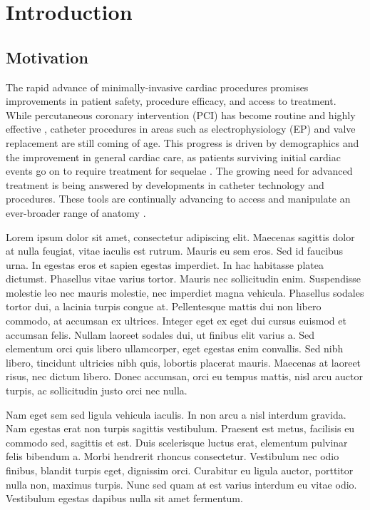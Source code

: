\chapter{\label{ch:1-intro}Introduction} 

\section{Motivation}

The rapid advance of minimally-invasive cardiac procedures promises improvements in patient safety, procedure efficacy, and access to treatment.  While percutaneous coronary intervention (PCI) has become routine and highly effective \cite{bravata_systematic_2007}, catheter procedures in areas such as electrophysiology (EP) and valve replacement are still coming of age.  This progress is driven by demographics and the improvement in general cardiac care, as patients surviving initial cardiac events go on to require treatment for sequelae \cite{foot_demographics_2000}.  The growing need for advanced treatment is being answered by developments in catheter technology and procedures.  These tools are continually advancing to access and manipulate an ever-broader range of anatomy \cite{sousa_new_2005}.

Lorem ipsum dolor sit amet, consectetur adipiscing elit. Maecenas sagittis dolor at nulla feugiat, vitae iaculis est rutrum. Mauris eu sem eros. Sed id faucibus urna. In egestas eros et sapien egestas imperdiet. In hac habitasse platea dictumst. Phasellus vitae varius tortor. Mauris nec sollicitudin enim. Suspendisse molestie leo nec mauris molestie, nec imperdiet magna vehicula. Phasellus sodales tortor dui, a lacinia turpis congue at. Pellentesque mattis dui non libero commodo, at accumsan ex ultrices. Integer eget ex eget dui cursus euismod et accumsan felis. Nullam laoreet sodales dui, ut finibus elit varius a. Sed elementum orci quis libero ullamcorper, eget egestas enim convallis. Sed nibh libero, tincidunt ultricies nibh quis, lobortis placerat mauris. Maecenas at laoreet risus, nec dictum libero. Donec accumsan, orci eu tempus mattis, nisl arcu auctor turpis, ac sollicitudin justo orci nec nulla.

Nam eget sem sed ligula vehicula iaculis. In non arcu a nisl interdum gravida. Nam egestas erat non turpis sagittis vestibulum. Praesent est metus, facilisis eu commodo sed, sagittis et est. Duis scelerisque luctus erat, elementum pulvinar felis bibendum a. Morbi hendrerit rhoncus consectetur. Vestibulum nec odio finibus, blandit turpis eget, dignissim orci. Curabitur eu ligula auctor, porttitor nulla non, maximus turpis. Nunc sed quam at est varius interdum eu vitae odio. Vestibulum egestas dapibus nulla sit amet fermentum.

